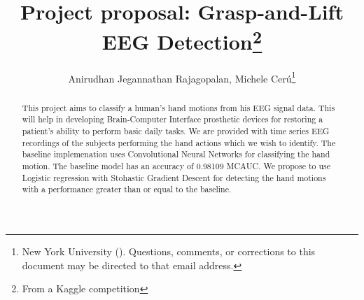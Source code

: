 \documentclass[final,leqno,onefignum,onetabnum]{siamltexmm}
\title{Project proposal: Grasp-and-Lift EEG Detection\thanks{From a Kaggle competition}}
\author{Anirudhan Jegannathan Rajagopalan, Michele Cer\'u\thanks{New York University (\email{ajr619@nyu.edu; mc3784@nyu.edu}). Questions, comments, or corrections
to this document may be directed to that email address.}}
\begin{document}
\maketitle
\newcommand{\slugmaster}{%
\slugger{siads}{xxxx}{xx}{x}{x---x}}%

\begin{abstract}
  This project aims to classify a human's hand motions from his EEG signal data.  This will help in developing Brain-Computer Interface prosthetic devices for restoring a patient's ability to perform basic daily tasks.
  We are provided with time series EEG recordings of the subjects performing the hand actions which we wish to identify.
  The baseline implemenation uses Convolutional Neural Networks for classifying the hand motion.  The baseline model has an accuracy of 0.98109 MCAUC\@.  
  We propose to use Logistic regression with Stohastic Gradient Descent for detecting the hand motions with a performance greater than or equal to the baseline.
\end{abstract}

\pagestyle{myheadings}
\thispagestyle{plain}
\end{document}
